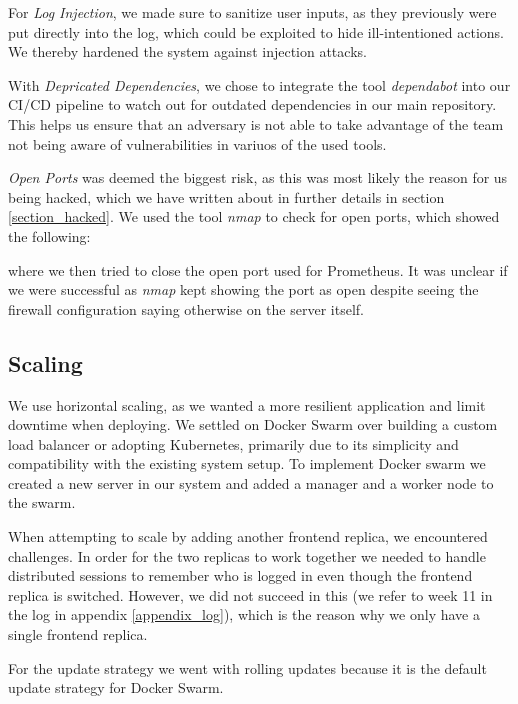For \textit{Log Injection}, we made sure to sanitize user inputs, as they previously were put directly into the log, which could be exploited to hide ill-intentioned actions. We thereby hardened the system against injection attacks.

With \textit{Depricated Dependencies}, we chose to integrate the tool \textit{dependabot} into our CI/CD pipeline to watch out for outdated dependencies in our main repository. This helps us ensure that an adversary is not able to take advantage of the team not being aware of vulnerabilities in variuos of the used tools.

\textit{Open Ports} was deemed the biggest risk, as this was most likely the reason for us being hacked, which we have written about in further details in section \ref{section_hacked}. We used the tool \textit{nmap} to check for open ports, which showed the following:

where we then tried to close the open port used for Prometheus. It was unclear if we were successful as \textit{nmap} kept showing the port as open despite seeing the firewall configuration saying otherwise on the server itself.

\subsection{Scaling}
We use horizontal scaling, as we wanted a more resilient application and limit downtime when deploying. We settled on Docker Swarm over building a custom load balancer or adopting Kubernetes, primarily due to its simplicity and compatibility with the existing system setup. To implement Docker swarm we created a new server in our system and added a manager and a worker node to the swarm.

When attempting to scale by adding another frontend replica, we encountered challenges. In order for the two replicas to work together we needed to handle distributed sessions to remember who is logged in even though the frontend replica is switched. However, we did not succeed in this (we refer to week 11 in the log in appendix \ref{appendix_log}), which is the reason why we only have a single frontend replica.

For the update strategy we went with rolling updates because it is the default update strategy for Docker Swarm.
